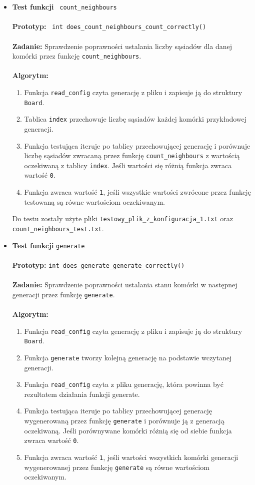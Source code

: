 \documentclass[12pt,a4paper,notitlepage]{report}
\begin{document}
\begin{itemize}
	\item\textbf {Test funkcji} \verb| count_neighbours|\\
	\\
	\textbf{Prototyp:} \verb| int does_count_neighbours_count_correctly()|\\
	\\
	\textbf{Zadanie:} Sprawdzenie poprawności ustalania liczby sąsiadów dla danej komórki przez funkcję \verb|count_neighbours|.\\
	\\
	\textbf{Algorytm:}
	\begin{enumerate}
		\item Funkcja \verb|read_config| czyta generację z pliku i zapisuje ją do struktury \verb|Board|.
		\item Tablica \verb|index| przechowuje liczbę sąsiadów każdej komórki przykładowej generacji.
		\item Funkcja testująca iteruje po tablicy przechowującej generację i porównuje liczbę sąsiadów zwracaną przez funkcję \verb|count_neighbours| z wartością oczekiwaną z tablicy \verb|index|. Jeśli wartości się różnią funkcja zwraca wartość \verb|0|.
		\item Funkcja zwraca wartość \verb|1|, jeśli wszystkie wartości zwrócone przez funkcję testowaną są równe wartościom oczekiwanym.
	\end{enumerate}
Do testu zostały użyte pliki \verb|testowy_plik_z_konfiguracja_1.txt| oraz \verb|count_neighbours_test.txt|.
	
	\item\textbf {Test funkcji} \verb|generate|\\
	\\
	\textbf{Prototyp:} \verb|int does_generate_generate_correctly()|\\
	\\
	\textbf{Zadanie:} Sprawdzenie poprawności ustalania stanu komórki w następnej generacji przez funkcję \verb|generate|.\\
	\\
	\textbf{Algorytm:}
	\begin{enumerate}
		\item Funkcja \verb|read_config| czyta generację z pliku i zapisuje ją do struktury \verb|Board|.
		\item Funkcja \verb|generate| tworzy kolejną generację na podstawie wczytanej generacji.
		\item Funkcja \verb|read_config| czyta z pliku generację, która powinna być rezultatem działania funkcji generate.
		\item Funkcja testująca iteruje po tablicy przechowującej generację wygenerowaną przez funkcję \verb|generate| i porównuje ją z generacją oczekiwaną. Jeśli porównywane komórki różnią się od siebie funkcja zwraca wartość \verb|0|.
		\item Funkcja zwraca wartość \verb|1|, jeśli wartości wszystkich komórki generacji wygenerowanej przez funkcję \verb|generate| są równe wartościom oczekiwanym.
		\end{enumerate}


\end{itemize}
\end{document}
